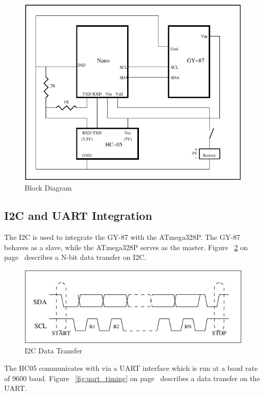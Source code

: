 \documentclass[11pt, a4paper]{article}
\begin{document}
\begin{figure}[htb]
    \centering
    \includegraphics[width=\linewidth]{BD.pdf}
    \caption{Block Diagram}
    \label{fig:bd}
\end{figure}


\subsection{I2C and UART Integration}
The I2C is used to integrate the GY-87 with the ATmega328P. The GY-87 behaves
as a slave, while the ATmega328P serves as the master. Figure
~\ref{fig:i2c_timing} on page~\pageref{fig:i2c_timing} describes a N-bit data
transfer on I2C.

\begin{figure}[htb]
    \centering
    \includegraphics[width=\linewidth]{I2C_Timing.pdf}
    \caption{I2C Data Transfer}
    \label{fig:i2c_timing}
\end{figure}

\noindent The HC05 communicates with via a UART interface which is run at a
baud rate of 9600 baud. Figure ~\ref{fig:uart_timing} on
page~\pageref{fig:uart_timing} describes a data transfer on the UART.
\end{document}
